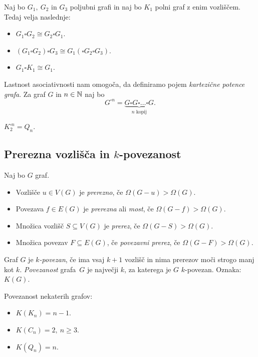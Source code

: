 \begin{trditev}
    Naj bo $G_1, \ G_2$ in $G_3$ poljubni grafi in naj bo $K_1$ polni graf z enim vozliščem. Tedaj velja naslednje:
    \begin{itemize}
        \item $G_1 \square G_2 \cong G_2 \square G_1$.
        \item $(G_1 \square G_2) \square G_3 \cong G_1 (\square G_2 \square G_3)$.
        \item $G_1 \square K_1 \cong G_1$.
    \end{itemize}
\end{trditev}

Lastnost asociativnosti nam omogoča, da definiramo pojem \emph{kartezične potence grafa}. Za graf $G$ in $n \in \mathbb{N}$ naj bo $$G^{\square n} = \underbrace{G \square G \square \ldots \square G}_\text{$n$ kopij}.$$

\begin{primer}
    $K_2^{\square n} = Q_n$.
\end{primer}

\subsection{Prerezna vozlišča in $k$-povezanost}
\begin{definicija}
    Naj bo $G$ graf.
    \begin{itemize}
        \item Vozlišče $u \in V(G)$ je \emph{prerezno}, če $\Omega(G-u) > \Omega(G)$.
        \item Povezava $f \in E(G)$ je \emph{prerezna} ali \emph{most}, če $\Omega(G-f) > \Omega(G)$.
        \item Množica vozlišč $S \subseteq V(G)$ je \emph{prerez}, če $\Omega(G-S) > \Omega(G)$.
        \item Množica povezav $F \subseteq E(G)$, če \emph{povezavni prerez}, če $\Omega(G-F) > \Omega(G)$.
    \end{itemize}
\end{definicija}

\begin{definicija}
    Graf $G$ je \emph{$k$-povezan}, če ima vsaj $k+1$ vozlišč in nima prerezov moči strogo manj kot $k$. \emph{Povezanost} grafa~$G$ je največji $k$, za katerega je $G$ $k$-povezan. Oznaka: $K(G)$.
\end{definicija}

\begin{primer}
    Povezanost nekaterih grafov:
    \begin{itemize}
        \item $K(K_n) = n-1$.
        \item $K(C_n) = 2, \ n \geq 3$.
        \item $K(Q_n) = n$.
    \end{itemize}
\end{primer}

